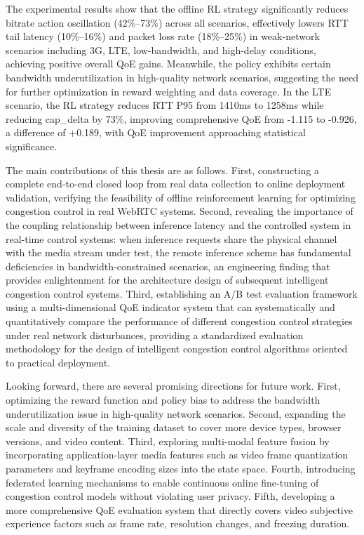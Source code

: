 {The experimental results show that the offline RL strategy significantly reduces bitrate action oscillation (42\%--73\%) across all scenarios, effectively lowers RTT tail latency (10\%--16\%) and packet loss rate (18\%--25\%) in weak-network scenarios including 3G, LTE, low-bandwidth, and high-delay conditions, achieving positive overall QoE gains. Meanwhile, the policy exhibits certain bandwidth underutilization in high-quality network scenarios, suggesting the need for further optimization in reward weighting and data coverage. In the LTE scenario, the RL strategy reduces RTT P95 from 1410ms to 1258ms while reducing cap\_delta by 73\%, improving comprehensive QoE from -1.115 to -0.926, a difference of +0.189, with QoE improvement approaching statistical significance.

The main contributions of this thesis are as follows. First, constructing a complete end-to-end closed loop from real data collection to online deployment validation, verifying the feasibility of offline reinforcement learning for optimizing congestion control in real WebRTC systems. Second, revealing the importance of the coupling relationship between inference latency and the controlled system in real-time control systems: when inference requests share the physical channel with the media stream under test, the remote inference scheme has fundamental deficiencies in bandwidth-constrained scenarios, an engineering finding that provides enlightenment for the architecture design of subsequent intelligent congestion control systems. Third, establishing an A/B test evaluation framework using a multi-dimensional QoE indicator system that can systematically and quantitatively compare the performance of different congestion control strategies under real network disturbances, providing a standardized evaluation methodology for the design of intelligent congestion control algorithms oriented to practical deployment.

Looking forward, there are several promising directions for future work. First, optimizing the reward function and policy bias to address the bandwidth underutilization issue in high-quality network scenarios. Second, expanding the scale and diversity of the training dataset to cover more device types, browser versions, and video content. Third, exploring multi-modal feature fusion by incorporating application-layer media features such as video frame quantization parameters and keyframe encoding sizes into the state space. Fourth, introducing federated learning mechanisms to enable continuous online fine-tuning of congestion control models without violating user privacy. Fifth, developing a more comprehensive QoE evaluation system that directly covers video subjective experience factors such as frame rate, resolution changes, and freezing duration.
}
